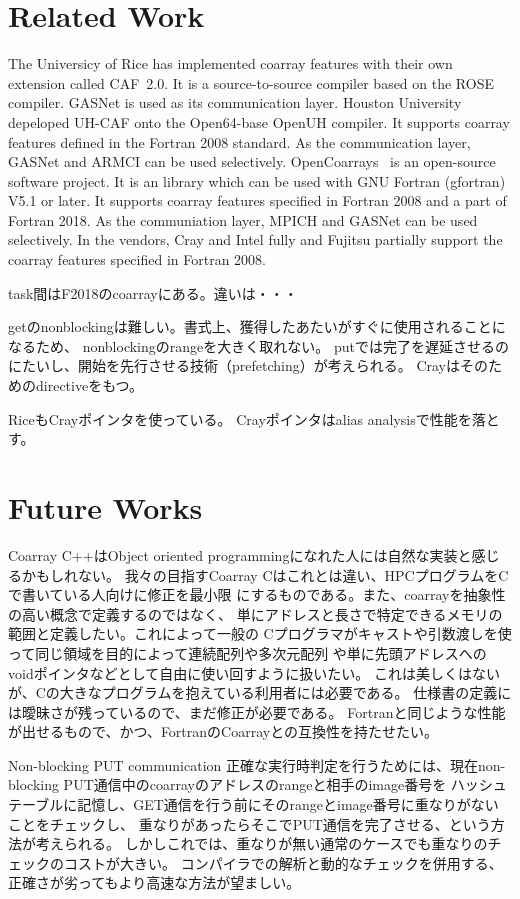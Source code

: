 \section{Related Work}\label{sec:related}

The Universicy of Rice has implemented coarray features with their own extension called CAF~2.0.
It is a source-to-source compiler based on the ROSE compiler. GASNet is used as its 
communication layer.
%
Houston University depeloped UH-CAF onto the Open64-base OpenUH compiler. It supports
coarray features defined in the Fortran 2008 standard. As the communication layer,
GASNet and ARMCI can be used selectively.
%
OpenCoarrays~\cite{OpenCo} is an open-source software project. It is an library 
which can be used with GNU Fortran (gfortran) V5.1 or later. It supports coarray features
specified in Fortran 2008 and a part of Fortran 2018.  As the communiation layer,
MPICH and GASNet can be used selectively.
%
In the vendors, Cray and Intel fully and Fujitsu partially support the coarray features
specified in Fortran 2008.


task間はF2018のcoarrayにある。違いは・・・

getのnonblockingは難しい。書式上、獲得したあたいがすぐに使用されることになるため、
nonblockingのrangeを大きく取れない。
putでは完了を遅延させるのにたいし、開始を先行させる技術（prefetching）が考えられる。
Crayはそのためのdirectiveをもつ。

RiceもCrayポインタを使っている。
Crayポインタはalias analysisで性能を落とす。


\section{Future Works}\label{sec:related}

Coarray C++はObject oriented programmingになれた人には自然な実装と感じるかもしれない。
我々の目指すCoarray Cはこれとは違い、HPCプログラムをCで書いている人向けに修正を最小限
にするものである。また、coarrayを抽象性の高い概念で定義するのではなく、
単にアドレスと長さで特定できるメモリの範囲と定義したい。これによって一般の
Cプログラマがキャストや引数渡しを使って同じ領域を目的によって連続配列や多次元配列
や単に先頭アドレスへのvoidポインタなどとして自由に使い回すように扱いたい。
これは美しくはないが、Cの大きなプログラムを抱えている利用者には必要である。
仕様書の定義には曖昧さが残っているので、まだ修正が必要である。
Fortranと同じような性能が出せるもので、かつ、FortranのCoarrayとの互換性を持たせたい。

Non-blocking PUT communication 
正確な実行時判定を行うためには、現在non-blocking PUT通信中のcoarrayのアドレスのrangeと相手のimage番号を
ハッシュテーブルに記憶し、GET通信を行う前にそのrangeとimage番号に重なりがないことをチェックし、
重なりがあったらそこでPUT通信を完了させる、という方法が考えられる。
しかしこれでは、重なりが無い通常のケースでも重なりのチェックのコストが大きい。
コンパイラでの解析と動的なチェックを併用する、正確さが劣ってもより高速な方法が望ましい。

